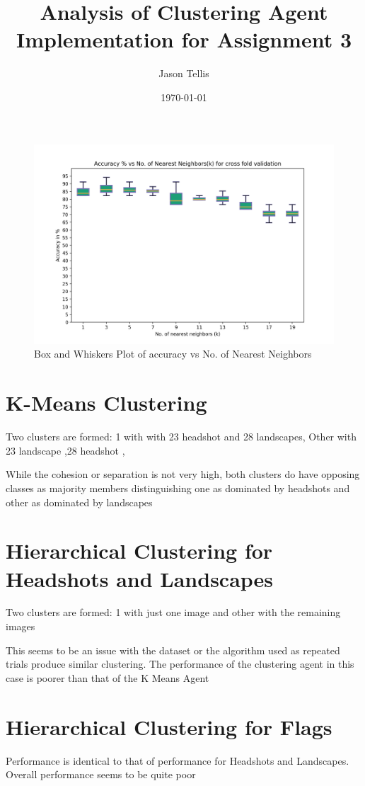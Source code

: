\documentclass{article}
\title{Analysis of Clustering Agent Implementation for Assignment 3}
\author{Jason Tellis}
\date{\today}
\begin{document}
\begin{figure}
  \includegraphics[width=\linewidth]{accuracy_plot_k=20.png}
  \caption{Box and Whiskers Plot of accuracy vs No. of Nearest Neighbors}
\end{figure}

\section{K-Means Clustering}
Two clusters are formed:
1 with with 23 headshot and 28 landscapes,
Other with 23 landscape ,28 headshot ,

While the cohesion or separation is not very high, both clusters do have opposing classes as majority members distinguishing one as dominated by headshots and other as dominated by landscapes


\section{Hierarchical Clustering for Headshots and Landscapes}
Two clusters are formed:
1 with just one image and other with the remaining images

This seems to be an issue with the dataset or the algorithm used as repeated trials produce similar clustering.
The performance of the clustering agent in this case is poorer than that of the K Means Agent

\section{Hierarchical Clustering for Flags}
Performance is identical to that of performance for Headshots and Landscapes.
Overall performance seems to be quite poor
\end{document}
